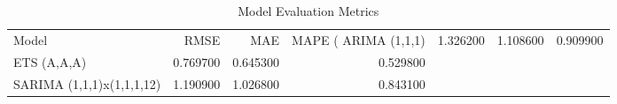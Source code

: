 \begin{table}
\caption{Model Evaluation Metrics}
\label{tab:evaluation}
\begin{tabular}{lrrr}
\toprule
Model & RMSE & MAE & MAPE (%
\midrule
ARIMA (1,1,1) & 1.326200 & 1.108600 & 0.909900 \\
ETS (A,A,A) & 0.769700 & 0.645300 & 0.529800 \\
SARIMA (1,1,1)x(1,1,1,12) & 1.190900 & 1.026800 & 0.843100 \\
\bottomrule
\end{tabular}
\end{table}
